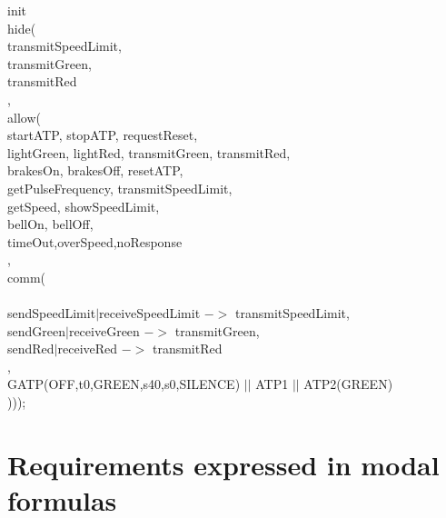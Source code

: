 \documentclass[11pt,a4paper]{article}
\begin{document}
		
init     \\                                                 
	hide({ \\
	transmitSpeedLimit, \\
	transmitGreen,\\
	transmitRed\\
	},	\\

	allow({ \\
		startATP, stopATP, requestReset, \\
		lightGreen, lightRed, transmitGreen, transmitRed,\\
		brakesOn, brakesOff, resetATP,\\
		getPulseFrequency, transmitSpeedLimit,\\
		getSpeed, showSpeedLimit,\\
		bellOn, bellOff,\\
		timeOut,overSpeed,noResponse\\
		},\\
	comm( \\
		{ \\
		sendSpeedLimit$\mid$receiveSpeedLimit $->$ transmitSpeedLimit, \\
		sendGreen$\mid$receiveGreen $->$ transmitGreen, \\
		sendRed$\mid$receiveRed $->$ transmitRed \\
		}, \\


		GATP(OFF,t0,GREEN,s40,s0,SILENCE) $\mid$$\mid$ ATP1 $\mid$$\mid$ ATP2(GREEN) \\
	))); \\

	




\newpage

\section{Requirements expressed in modal formulas}
\end{document}

